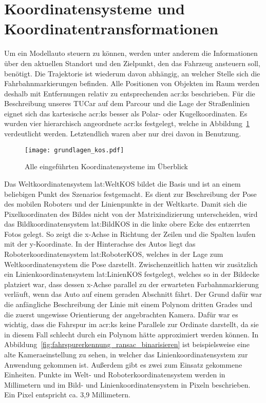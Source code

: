 \section{Koordinatensysteme und Koordinatentransformationen} \label{sec:ks}

Um ein Modellauto steuern zu können, werden unter anderem die Informationen über den aktuellen Standort und den Zielpunkt, den das Fahrzeug ansteuern soll, benötigt. Die Trajektorie ist wiederum davon abhängig, an welcher Stelle sich die Fahrbahnmarkierungen befinden. Alle Positionen von Objekten im Raum werden deshalb mit Entfernungen relativ zu entsprechenden \gls{acr:ks} beschrieben. Für die Beschreibung unseres TUCar auf dem Parcour und die Lage der Straßenlinien eignet sich das kartesische \gls{acr:ks} besser als Polar- oder Kugelkoordinaten. Es wurden vier hierarchisch angeordnete \gls{acr:ks} festgelegt, welche in Abbildung~\ref{fig:grundlagen_kos} verdeutlicht werden. Letztendlich waren aber nur drei davon in Benutzung. 

\begin{figure}[H] %
  \centering
  \texttt{[image: grundlagen\_kos.pdf]}
  \caption{Alle eingeführten Koordinatensysteme im Überblick}
  \label{fig:grundlagen_kos}
\end{figure}

Das Weltkoordinatensystem \gls{lat:WeltKOS} bildet die Basis und ist an einem beliebigen Punkt des Szenarios festgemacht. Es dient zur Beschreibung der Pose des mobilen Roboters und der Linienpunkte in der Weltkarte. Damit sich die Pixelkoordinaten des Bildes nicht von der Matrixindizierung unterscheiden, wird das Bildkoordinatensystem \gls{lat:BildKOS} in die linke obere Ecke des entzerrten Fotos gelegt. So zeigt die x-Achse in Richtung der Zeilen und die Spalten laufen mit der y-Koordinate. In der Hinterachse des Autos liegt das Roboterkoordinatensystem \gls{lat:RoboterKOS}, welches in der Lage zum Weltkoordinatensystem die Pose darstellt. Zwischenzeitlich hatten wir zusätzlich ein Linienkoordinatensystem \gls{lat:LinienKOS} festgelegt, welches so in der Bildecke platziert war, dass dessen x-Achse parallel zu der erwarteten Farbahnmarkierung verläuft, wenn das Auto auf einem geraden Abschnitt fährt. Der Grund dafür war die anfängliche Beschreibung der Linie mit einem Polynom dritten Grades und die zuerst ungewisse Orientierung der angebrachten Kamera. Dafür war es wichtig, dass die Fahrspur im \gls{acr:ks} keine Parallele zur Ordinate darstellt, da sie in diesem Fall schlecht durch ein Polynom hätte approximiert werden können. In Abbildung~\ref{fig:fahrspurerkennung_ransac_binarisieren} ist beispielsweise eine alte Kameraeinstellung zu sehen, in welcher das Linienkoordinatensystem zur Anwendung gekommen ist. Außerdem gibt es zwei zum Einsatz gekommene Einheiten. Punkte im Welt- und Roboterkoordinatensystem werden in Millimetern und im Bild- und Linienkoordinatensystem in Pixeln beschrieben. Ein Pixel entspricht ca. 3,9 Millimetern.

